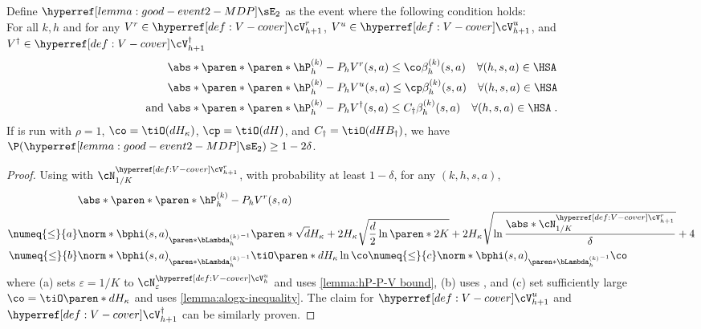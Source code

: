 \begin{lemma}\label{lemma:good-event2-MDP}
Define $\confevent$ as the event where the following condition holds: \\
For all $k, h$ and for any $V^r \in \cVr_{h+1}$, $V^u \in \cVu_{h+1}$, and $V^\dagger \in \cVc_{h+1}$
\begin{align*}
&\abs*{\paren*{\paren*{\hP_h^{(k)}-P_h}
V^r}(s, a)} 
\leq 
\co\beta^{(k)}_h(s, a)\quad \forall (h, s, a) \in \HSA\\
&\abs*{\paren*{\paren*{\hP_h^{(k)}-P_h}
V^u}(s, a)} 
\leq 
\cp\beta^{(k)}_h(s, a)\quad \forall (h, s, a) \in \HSA\\
\text{and } &\abs*{\paren*{\paren*{\hP_h^{(k)}-P_h}
V^\dagger}(s, a)} 
\leq 
C_\dagger\beta^{(k)}_h(s, a)\quad \forall (h, s, a) \in \HSA\;.
\end{align*}
If  is run with $\rho =1$, $\co = \tiO(dH_\kappa)$, $\cp=\tiO(dH)$, and $C_\dagger=\tiO(dHB_\dagger)$, we have $\P(\confevent) \geq 1 - 2\delta$.
\end{lemma}
\begin{proof}
Using  with $\cN^{\cVr_{h+1}}_{1 / K}$, with probability at least $1-\delta$, for any $(k, h, s, a)$, 
\begin{align*}
&\abs*{\paren*{\paren*{\hP_h^{(k)}-P_h}
V^r}(s, a)} \\
\numeq{\leq}{a}
&\norm*{\bphi(s, a)}_{\paren*{\bLambda_h^{(k)}}^{-1} }
\paren*{
\sqrt{d}H_\kappa
+ 
2 H_\kappa\sqrt{\frac{d}{2} \ln \paren*{2K}}
+2H_\kappa \sqrt{\ln \frac{\abs*{\cN^{\cVr_{h+1}}_{1/K}}}{\delta}}
+4
}\\
\numeq{\leq}{b}
&\norm*{\bphi(s, a)}_{\paren*{\bLambda_h^{(k)}}^{-1} }
\tiO \paren*{dH_\kappa}\ln \co
\numeq{\leq}{c}
\norm*{\bphi(s, a)}_{\paren*{\bLambda_h^{(k)}}^{-1} }\co
\end{align*}
where (a) sets $\varepsilon=1/K$ to $\cN^{\cVu_h}_{\varepsilon}$ and uses \cref{lemma:hP-P-V bound}, (b) uses , and (c) set sufficiently large $\co=\tiO\paren*{dH_\kappa}$ and uses \cref{lemma:alogx-inequality}.
The claim for $\cVu_{h+1}$ and $\cVc_{h+1}$ can be similarly proven.
\end{proof}


